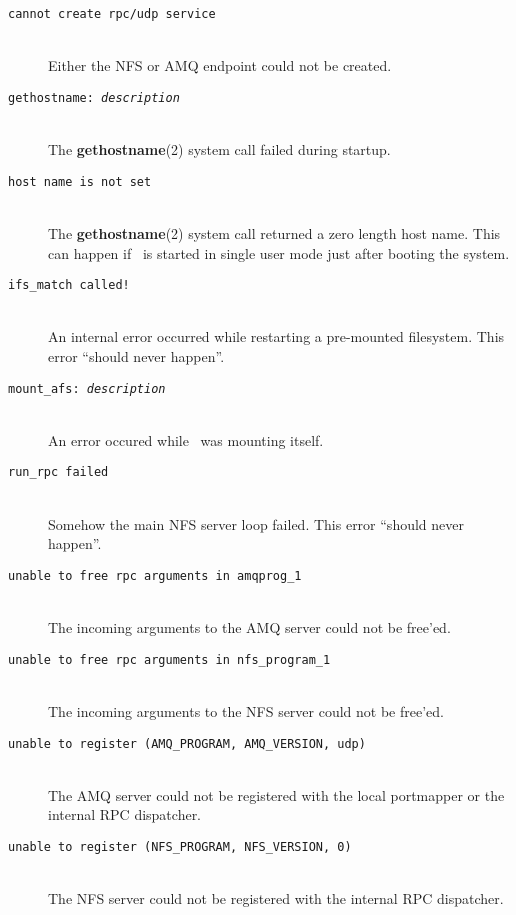 \begin{description}
\item [\tt cannot create rpc/udp service]\mbox{}\\
Either the NFS or AMQ endpoint could not be created.

\item [\tt gethostname:\ {\em description}]\mbox{}\\
The {\bf gethostname}(2) system call failed during startup.

\item [\tt host name is not set]\mbox{}\\
The {\bf gethostname}(2) system call returned a zero length
host name.
This can happen if \amd\ is started in single user mode just
after booting the system.

\item [\tt ifs\_match called!]\mbox{}\\
An internal error occurred while restarting a pre-mounted
filesystem.
This error ``should never happen''.

\item [\tt mount\_afs:\ {\em description}]\mbox{}\\
An error occured while \amd\ was mounting itself.

\item [\tt run\_rpc failed]\mbox{}\\
Somehow the main NFS server loop failed.
This error ``should never happen''.

\item [\tt unable to free rpc arguments in amqprog\_1]\mbox{}\\
The incoming arguments to the AMQ server could not be
free'ed.

\item [\tt unable to free rpc arguments in nfs\_program\_1]\mbox{}\\
The incoming arguments to the NFS server could not be
free'ed.

\item [\tt unable to register (AMQ\_PROGRAM, AMQ\_VERSION, udp)]\mbox{}\\
The AMQ server could not be registered with the local portmapper
or the internal RPC dispatcher.

\item [\tt unable to register (NFS\_PROGRAM, NFS\_VERSION, 0)]\mbox{}\\
The NFS server could not be registered with the internal RPC dispatcher.

\end{description}


